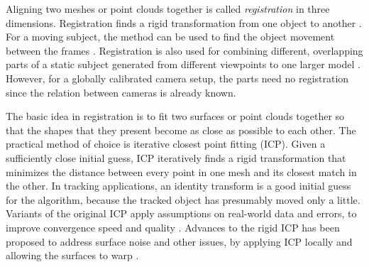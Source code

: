 Aligning two meshes or point clouds together is called \emph{registration} in three dimensions.
Registration finds a rigid transformation from one object to another \cite{zhang1994iterative,rusinkiewicz2001efficient}.
For a moving subject, the method can be used to find the object movement between the frames \cite{pons2005modelling,zhao2005alignment}.
Registration is also used for combining different, overlapping parts of a static subject generated from different viewpoints to one larger model \cite{eggert1998simultaneous,huber2003fully}.
However, for a globally calibrated camera setup, the parts need no registration since the relation between cameras is already known.

The basic idea in registration is to fit two surfaces or point clouds together so that the shapes that they present become as close as possible to each other.
The practical method of choice is iterative closest point fitting (ICP).
Given a sufficiently close initial guess, ICP iteratively finds a rigid transformation that minimizes the distance between every point in one mesh and its closest match in the other.
In tracking applications, an identity transform is a good initial guess for the algorithm, because the tracked object has presumably moved only a little.
Variants of the original ICP apply assumptions on real-world data and errors, to improve convergence speed and quality \cite{zhang1994iterative,rusinkiewicz2001efficient}.
Advances to the rigid ICP has been proposed to address surface noise and other issues, by applying ICP locally and allowing the surfaces to warp \cite{brown2007global}.


